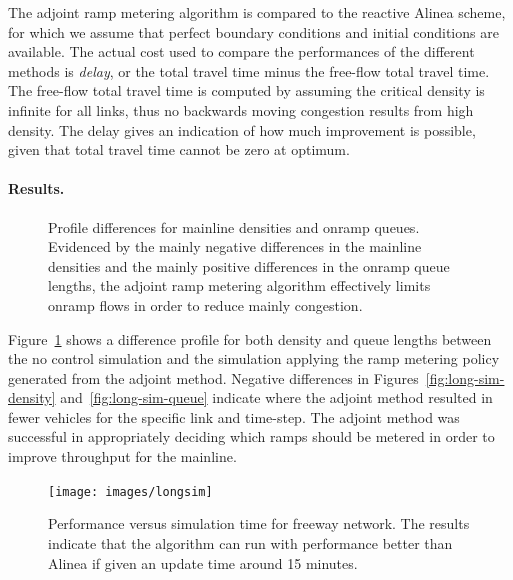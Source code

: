							The adjoint ramp metering algorithm is compared to the reactive Alinea
							scheme, for which we assume that perfect boundary conditions and initial conditions
							are available. The actual cost used to compare the performances of
							the different methods is \emph{delay}, or the total travel time minus
							the free-flow total travel time. The free-flow total travel time is
							computed by assuming the critical density is infinite for all links,
							thus no backwards moving congestion results from high density. The
							delay gives an indication of how much improvement is possible, given
							that total travel time cannot be zero at optimum.
														
														
							\paragraph{Results.}
														
							\begin{figure}[t]
								\hfill{}
																
								\caption{Profile differences for mainline densities and onramp queues. Evidenced
									by the mainly negative differences in the mainline densities and the
									mainly positive differences in the onramp queue lengths, the adjoint
									ramp metering algorithm effectively limits onramp flows in order to
									reduce mainly congestion.\label{fig:long-sim}}
							\end{figure}
														
														
							Figure~\ref{fig:long-sim} shows a difference profile for both density and queue lengths between the
							no control simulation and the simulation applying the ramp metering
							policy generated from the adjoint method. Negative differences in
							Figures~\ref{fig:long-sim-density} and~\ref{fig:long-sim-queue}
							indicate where the adjoint method resulted in fewer vehicles for the
							specific link and time-step. The adjoint method was successful in
							appropriately deciding which ramps should be metered in order to improve
							throughput for the mainline.
							\begin{figure}
								\begin{centering}
									\texttt{[image: images/longsim]}
									\par\end{centering}
									\caption{Performance versus simulation time for freeway network. The results
										indicate that the algorithm can run with performance better than Alinea
										if given an update time around 15 minutes.}\label{fig:running-time}
								\end{figure}
																
